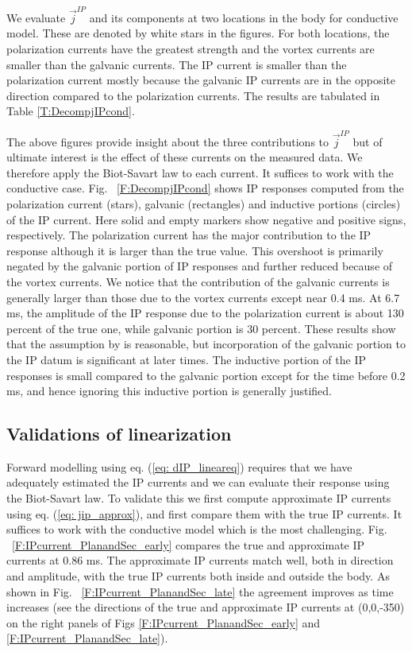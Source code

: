\documentclass[extra,mreferee]{gji}
\renewcommand {\j}  { {\vec j} }
\begin{document}
We evaluate $\j^{IP} $ and its components at two locations in the body for conductive model. These are denoted by white stars in the figures.  For both locations, the polarization currents have the greatest strength and the vortex currents are smaller than the galvanic currents. The IP current is smaller than the polarization current mostly because the galvanic IP currents are in the opposite direction compared to the polarization currents. The results are tabulated in Table \ref{T:DecompjIPcond}. 

The above figures provide insight about the three contributions to $\j^{IP}$ but of ultimate interest is the effect of these currents on the measured data. 
We therefore apply the Biot-Savart law to each current. It suffices to work with the conductive case. 
Fig. ~\ref{F:DecompjIPcond} shows IP responses computed from the polarization current (stars), galvanic (rectangles) and inductive portions (circles) of the IP current. Here solid and empty markers show negative and positive signs, respectively. 
The polarization current has the major contribution to the IP response although it is larger than the true value. This overshoot is primarily negated by the galvanic portion of IP responses and further reduced because of the vortex currents. We notice that the contribution of the galvanic currents is generally larger than those due to the vortex currents except near 0.4 ms. 
At 6.7 ms, the amplitude of the  IP response due to the polarization current is about 130 percent of the true one, while galvanic portion is 30 percent. 
These results show that the assumption by \cite{Smith1988a} is reasonable, but incorporation of the galvanic portion to the IP datum is significant at later times. 
The inductive portion of the IP responses  is small  compared to the galvanic portion except for the time before 0.2 ms, and hence ignoring this inductive portion is generally justified. 

\subsection{Validations of linearization}
Forward modelling using eq. (\ref{eq: dIP_lineareq}) requires that we have adequately estimated the IP currents and we can evaluate their response using the Biot-Savart law. To validate this we first compute approximate IP currents using eq. (\ref{eq: jip_approx}), and first compare them with the true IP currents. It suffices to work with the conductive model which is the most challenging. Fig. ~\ref{F:IPcurrent_PlanandSec_early} compares the true and approximate IP currents at 0.86 ms. The approximate IP currents match well, both in direction and amplitude, with the true IP currents both inside and outside the body. As shown in Fig. ~\ref{F:IPcurrent_PlanandSec_late} the agreement improves as time increases (see the directions of the true and approximate IP currents at (0,0,-350) on the right panels of Figs \ref{F:IPcurrent_PlanandSec_early} and \ref{F:IPcurrent_PlanandSec_late}).
\end{document}

